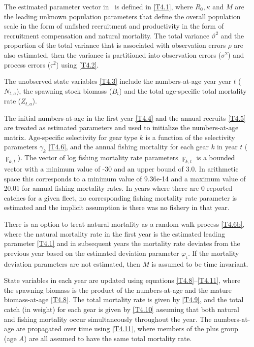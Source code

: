\begin{multicols}{2}
The estimated parameter vector in \iscam\ is defined in \eqref{T4.1}, where $R_0, \kappa$ and $M$ are the leading unknown population parameters that define the overall population scale in the form of unfished recruitment and productivity in the form of recruitment compensation and natural mortality.  The total variance $\vartheta^2$ and the proportion of the total variance that is associated with observation errors $\rho$ are also estimated, then the variance is partitioned into observation errors ($\sigma^2$) and process errors ($\tau^2$) using \eqref{T4.2}.

The unobserved state variables \eqref{T4.3} include the numbers-at-age year year $t$ ($N_{t,a}$), the spawning stock biomass ($B_t$) and the total age-specific total mortality rate ($Z_{t,a}$).

The initial numbers-at-age in the first year \eqref{T4.4} and the annual recruits \eqref{T4.5} are treated as estimated parameters and used to initialize the numbers-at-age matrix.  Age-specific selectivity for gear type $k$ is a function of the selectivity parameters $\gamma_k$ \eqref{T4.6}, and the annual fishing mortality for each gear $k$ in year $t$ ($\digamma_{k,t}$).  The vector of log fishing mortality rate parameters $\digamma_{k,t}$ is a bounded vector with a minimum value of -30 and an upper bound of 3.0.  In arithmetic space this corresponds to a minimum value of 9.36e-14 and a maximum value of 20.01 for annual fishing mortality rates.  In years where there are 0 reported catches for a given fleet, no corresponding fishing mortality rate parameter is estimated and the implicit assumption is there was no fishery in that year.

There is an option to treat natural mortality as a random walk process \eqref{T4.6b}, where the natural mortality rate in the first year is the estimated leading parameter \eqref{T4.1} and in subsequent years the mortality rate deviates from the previous year based on the estimated deviation parameter $\varphi_t$.  If the mortality deviation parameters are not estimated, then $M$ is assumed to be time invariant.

State variables in each year are updated using equations \ref{T4.8}--\ref{T4.11}, where the spawning biomass is the product of the numbers-at-age and the mature biomass-at-age \eqref{T4.8}.  The total mortality rate is given by \eqref{T4.9}, and the total catch (in weight) for each gear is given by \eqref{T4.10} assuming that both natural and fishing mortality occur simultaneously throughout the year.  The numbers-at-age are propagated over time using \eqref{T4.11}, where members of the plus group (age $A$) are all assumed to have the same total mortality rate.  


\end{multicols}
